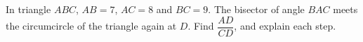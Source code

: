 In triangle $ABC$, $AB=7$, $AC=8$ and $BC=9$. The bisector of angle $BAC$ meets the circumcircle of the triangle again at $D$. Find $\dfrac{AD}{CD}$, and explain each step.
